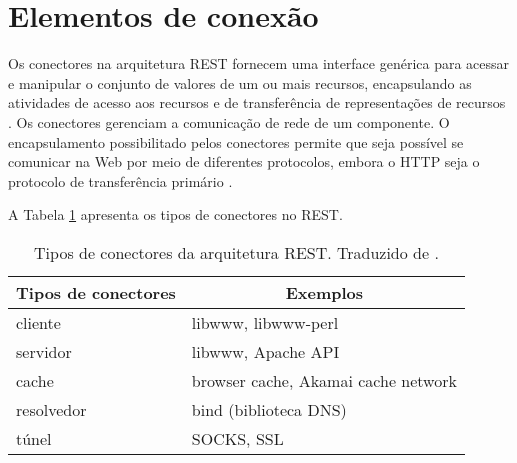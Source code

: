   \section{Elementos de conexão}
  
    Os conectores na arquitetura REST fornecem uma interface genérica para acessar e manipular o conjunto de valores de um ou mais recursos,
    encapsulando as atividades de acesso aos recursos e de transferência de representações de recursos \cite{fielding2002}.
    Os conectores gerenciam a comunicação de rede de um componente. 
    O encapsulamento possibilitado pelos conectores permite que seja possível se comunicar na Web por meio de diferentes protocolos,
    embora o HTTP seja o protocolo de transferência primário \cite{fielding2002}.
    
    A Tabela \ref{rest-connectors-elements} apresenta os tipos de conectores no REST.
    
    \begin{table}[ht!]
    \centering
    \caption{Tipos de conectores da arquitetura REST. Traduzido de \cite{fielding2002}.}
    \label{rest-connectors-elements}
    \begin{tabular}{l|l}
    \hline
    \multicolumn{1}{c|}{\textbf{Tipos de conectores}} & \multicolumn{1}{c}{\textbf{Exemplos}} \\ \hline
    cliente                                            & libwww, libwww-perl                    \\ \hline
    servidor                                           & libwww, Apache API                     \\ \hline
    cache                                              & browser cache, Akamai cache network    \\ \hline
    resolvedor                                         & bind (biblioteca DNS)                  \\ \hline
    túnel                                              & SOCKS, SSL                             \\ \hline
    \end{tabular}
    \end{table}
    